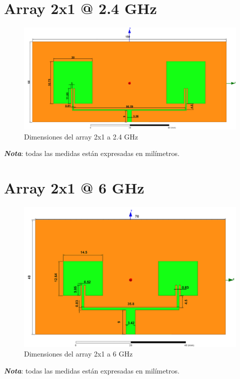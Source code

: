 \section{Array 2x1 @ 2.4 GHz}
\vfill
\begin{figure}[H]
   	 \centering
        \includegraphics[width=19cm ,height=\textwidth, keepaspectratio=true,angle=90,origin=c]{archivos/desarrollo/autocad/3}
        \caption{Dimensiones del array 2x1 a 2.4 GHz}
        \label{fig:2x11}
\end{figure}
\vfill
\textit{\textbf{Nota}}: todas las medidas están expresadas en milímetros.
\newpage

\section{Array 2x1 @ 6 GHz}
\vfill
\begin{figure}[H]
   	 \centering
        \includegraphics[width=19cm ,height=\textheight, keepaspectratio=true,angle=90,origin=c]{archivos/desarrollo/autocad/4}
        \caption{Dimensiones del array 2x1 a 6 GHz}
        \label{fig:2x12}
\end{figure}
\vfill
\textit{\textbf{Nota}}: todas las medidas están expresadas en milímetros.
\newpage

